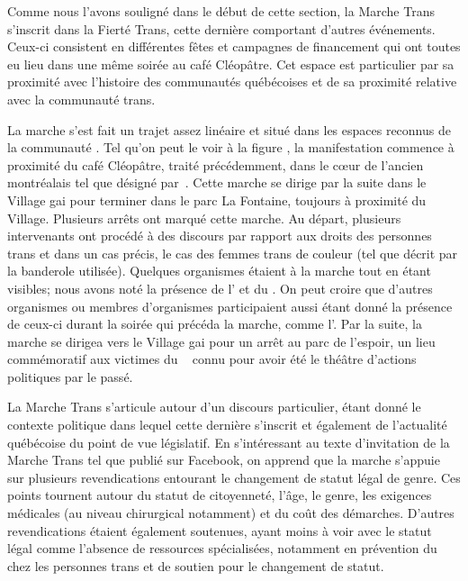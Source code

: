 Comme nous l'avons souligné dans le début de cette section, la Marche Trans s'inscrit dans la Fierté Trans, cette dernière comportant d'autres événements.
Ceux-ci consistent en différentes fêtes et campagnes de financement qui ont toutes eu lieu dans une même soirée au café Cléopâtre.
Cet espace est particulier par sa proximité avec l'histoire des communautés \lgbt{} québécoises et de sa proximité relative avec la communauté trans.

La marche s'est fait un trajet assez linéaire et situé dans les espaces reconnus de la communauté \lgbt{}.
Tel qu'on peut le voir à la figure , la manifestation commence à proximité du café Cléopâtre, traité précédemment, dans le cœur de l'ancien  montréalais tel que désigné par~\citet{Chamberland1993a}.
Cette marche se dirige par la suite dans le Village gai pour terminer dans le parc La Fontaine, toujours à proximité du Village.
Plusieurs arrêts ont marqué cette marche.
Au départ, plusieurs intervenants ont procédé à des discours par rapport aux droits des personnes trans et dans un cas précis, le cas des femmes trans de couleur (tel que décrit par la banderole utilisée).
Quelques organismes étaient à la marche tout en étant visibles; nous avons noté la présence de l'\atq{} et du \rlq{}.
On peut croire que d'autres organismes ou membres d'organismes participaient aussi étant donné la présence de ceux-ci durant la soirée qui précéda la marche, comme l'\astteq{}.
Par la suite, la marche se dirigea vers le Village gai pour un arrêt au parc de l'espoir, un lieu commémoratif aux victimes du \sida{}~\citep{Lafontaine2012} connu pour avoir été le théâtre d'actions politiques par le passé.

La Marche Trans s'articule autour d'un discours particulier, étant donné le contexte politique dans lequel cette dernière s'inscrit et également de l'actualité québécoise du point de vue législatif.
En s'intéressant au texte d'invitation de la Marche Trans tel que publié sur Facebook, on apprend que la marche s'appuie sur plusieurs revendications entourant le changement de statut légal de genre.
Ces points tournent autour du statut de citoyenneté, l'âge, le genre, les exigences médicales (au niveau chirurgical notamment) et du coût des démarches.
D'autres revendications étaient également soutenues, ayant moins à voir avec le statut légal comme l'absence de ressources spécialisées, notamment en prévention du \vih{} chez les personnes trans et de soutien pour le changement de statut.

